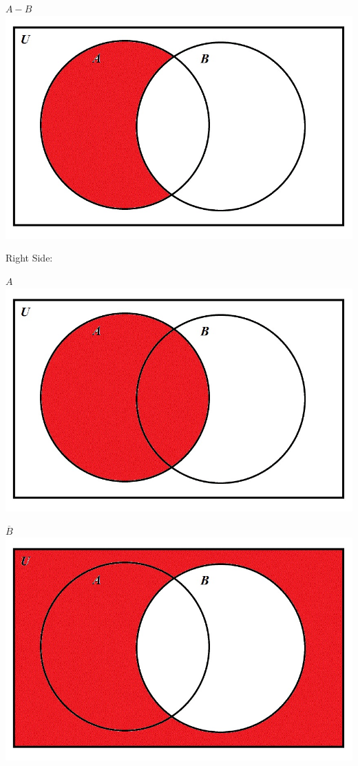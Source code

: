 \documentclass[10pt]{article}
\begin{document}
$A - B$\\
\includegraphics[scale=0.3]{11}

Right Side:

$A$\\
\includegraphics[scale=0.3]{9}

$\overline{B}$\\
\includegraphics[scale=0.3]{5}
\end{document}
